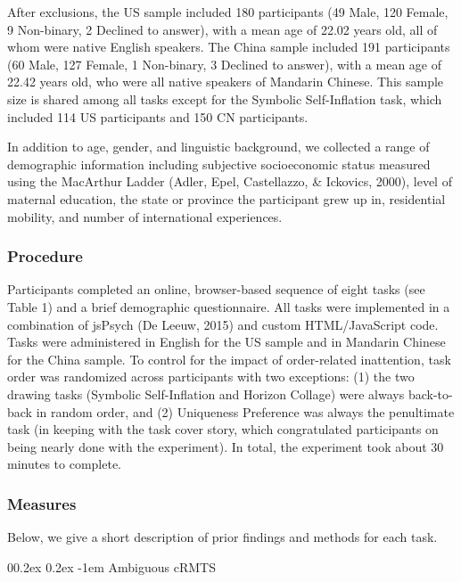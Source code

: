 \documentclass[
  man,floatsintext]{apa6}
\makeatletter
\let\oldparagraph\paragraph
\renewcommand{\paragraph}[1]{\oldparagraph{#1}\mbox{}}
\renewcommand{\paragraph}{\@startsection{paragraph}{4}{\parindent}%
  {0\baselineskip \@plus 0.2ex \@minus 0.2ex}%
  {-1em}%
  {\normalfont\normalsize\bfseries\itshape\typesectitle}}
\makeatother
\begin{document}
After exclusions, the US sample included 180 participants (49 Male, 120 Female, 9 Non-binary, 2 Declined to answer), with a mean age of 22.02 years old, all of whom were native English speakers. The China sample included 191 participants (60 Male, 127 Female, 1 Non-binary, 3 Declined to answer), with a mean age of 22.42 years old, who were all native speakers of Mandarin Chinese. This sample size is shared among all tasks except for the Symbolic Self-Inflation task, which included 114 US participants and 150 CN participants.

In addition to age, gender, and linguistic background, we collected a range of demographic information including subjective socioeconomic status measured using the MacArthur Ladder (Adler, Epel, Castellazzo, \& Ickovics, 2000), level of maternal education, the state or province the participant grew up in, residential mobility, and number of international experiences.

\hypertarget{procedure}{%
\subsubsection{Procedure}\label{procedure}}

Participants completed an online, browser-based sequence of eight tasks (see Table 1) and a brief demographic questionnaire. All tasks were implemented in a combination of jsPsych (De Leeuw, 2015) and custom HTML/JavaScript code. Tasks were administered in English for the US sample and in Mandarin Chinese for the China sample. To control for the impact of order-related inattention, task order was randomized across participants with two exceptions: (1) the two drawing tasks (Symbolic Self-Inflation and Horizon Collage) were always back-to-back in random order, and (2) Uniqueness Preference was always the penultimate task (in keeping with the task cover story, which congratulated participants on being nearly done with the experiment). In total, the experiment took about 30 minutes to complete.

\hypertarget{measures}{%
\subsubsection{Measures}\label{measures}}

Below, we give a short description of prior findings and methods for each task.

\hypertarget{ambiguous-crmts}{%
\paragraph{Ambiguous cRMTS}\label{ambiguous-crmts}}
\end{document}

